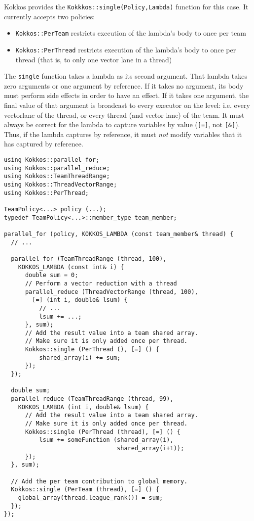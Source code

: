 Kokkos provides the \lstinline|Kokkkos::single(Policy,Lambda)| function for this case.
It currently accepts two policies:
\begin{itemize}
\item \lstinline|Kokkos::PerTeam| restricts execution of the lambda's
  body to once per team
\item \lstinline|Kokkos::PerThread| restricts execution of the
  lambda's body to once per thread (that is, to only one vector lane
  in a thread)
\end{itemize}
The \lstinline|single| function takes a lambda as its second argument.
That lambda takes zero arguments or one argument by reference. 
If it takes no argument, its body must perform side effects in order to have an effect.
If it takes one argument, the final value of that argument is broadcast to every executor on the level: 
i.e. every vectorlane of the thread, or every thread (and vector lane) of the team.  
It must always be correct for the lambda to capture variables by value
(\lstinline|[=]|, not \lstinline|[&]|).
Thus, if the lambda captures by reference,
it must \emph{not} modify variables that it has captured by reference.

\begin{lstlisting}
using Kokkos::parallel_for;
using Kokkos::parallel_reduce;
using Kokkos::TeamThreadRange;
using Kokkos::ThreadVectorRange;
using Kokkos::PerThread;

TeamPolicy<...> policy (...);
typedef TeamPolicy<...>::member_type team_member;

parallel_for (policy, KOKKOS_LAMBDA (const team_member& thread) {
  // ...

  parallel_for (TeamThreadRange (thread, 100), 
    KOKKOS_LAMBDA (const int& i) {
      double sum = 0;
      // Perform a vector reduction with a thread
      parallel_reduce (ThreadVectorRange (thread, 100), 
        [=] (int i, double& lsum) {
          // ...
          lsum += ...;
      }, sum);
      // Add the result value into a team shared array.
      // Make sure it is only added once per thread.
      Kokkos::single (PerThread (), [=] () {
          shared_array(i) += sum;
      });
  });
  
  double sum;
  parallel_reduce (TeamThreadRange (thread, 99), 
    KOKKOS_LAMBDA (int i, double& lsum) {
      // Add the result value into a team shared array.
      // Make sure it is only added once per thread.
      Kokkos::single (PerThread (thread), [=] () {
          lsum += someFunction (shared_array(i), 
                                shared_array(i+1));
      });
  }, sum);
  
  // Add the per team contribution to global memory.
  Kokkos::single (PerTeam (thread), [=] () {
    global_array(thread.league_rank()) = sum;
  });
});
\end{lstlisting}
 
